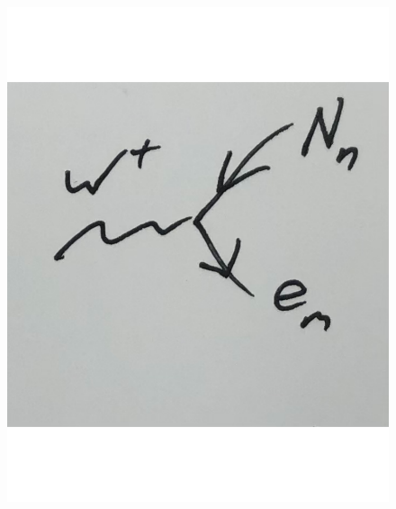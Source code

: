 \documentclass[
	11pt, %
]{beamer}
\begin{document}
\begin{frame}
\begin{itemize}
\begin{figure}
	\includegraphics[scale=.1]{N_e.pdf}
\end{figure}
	\end{itemize}
\end{frame}
\end{document}
